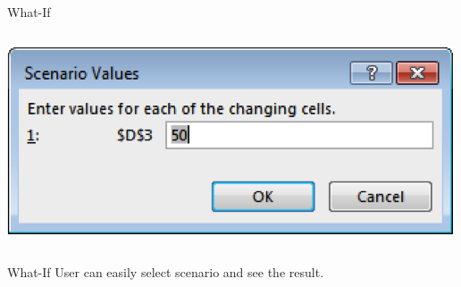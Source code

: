 \documentclass[xcolor=svgnames]{beamer}
\begin{document}
\begin{frame}{What-If}
\begin{columns}[T]
\begin{column}{.48\textwidth}
\hspace*{-6mm}\includegraphics[width=.9\textwidth]{whatif3.png}
\end{column}%
\end{columns}
\end{frame}




\begin{frame}{What-If}
User can easily select scenario and see the result.
\begin{center}
\end{center}

\end{frame}
\end{document}

